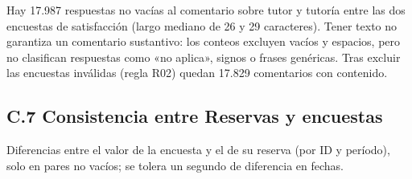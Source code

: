 \documentclass[11pt,letterpaper]{article}
\begin{document}
Hay 17.987 respuestas no vacías al comentario sobre tutor y tutoría entre las dos encuestas de satisfacción (largo mediano de 26 y 29 caracteres). Tener texto no garantiza un comentario sustantivo: los conteos excluyen vacíos y espacios, pero no clasifican respuestas como «no aplica», signos o frases genéricas. Tras excluir las encuestas inválidas (regla R02) quedan 17.829 comentarios con contenido.

\subsection*{C.7 Consistencia entre Reservas y encuestas}

Diferencias entre el valor de la encuesta y el de su reserva (por ID y período), solo en pares no vacíos; se tolera un segundo de diferencia en fechas.
\end{document}

